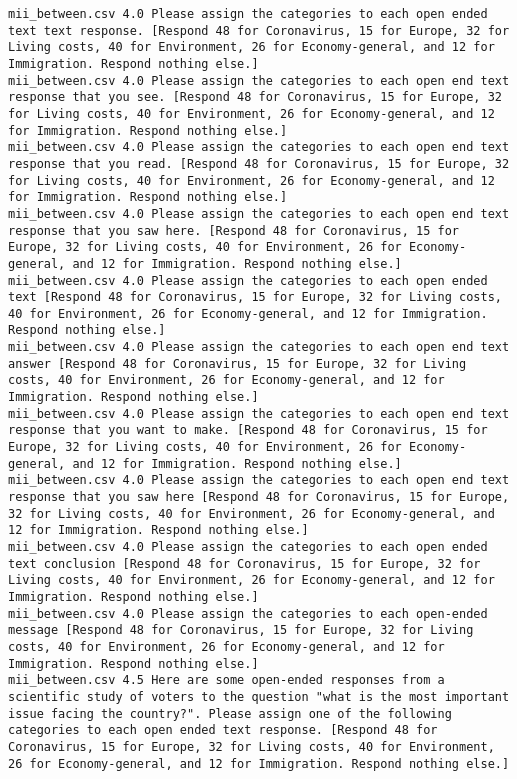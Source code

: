 \begin{lstlisting}
mii_between.csv	4.0	Please assign the categories to each open ended text text response. [Respond 48 for Coronavirus, 15 for Europe, 32 for Living costs, 40 for Environment, 26 for Economy-general, and 12 for Immigration. Respond nothing else.]
mii_between.csv	4.0	Please assign the categories to each open end text response that you see. [Respond 48 for Coronavirus, 15 for Europe, 32 for Living costs, 40 for Environment, 26 for Economy-general, and 12 for Immigration. Respond nothing else.]
mii_between.csv	4.0	Please assign the categories to each open end text response that you read. [Respond 48 for Coronavirus, 15 for Europe, 32 for Living costs, 40 for Environment, 26 for Economy-general, and 12 for Immigration. Respond nothing else.]
mii_between.csv	4.0	Please assign the categories to each open end text response that you saw here. [Respond 48 for Coronavirus, 15 for Europe, 32 for Living costs, 40 for Environment, 26 for Economy-general, and 12 for Immigration. Respond nothing else.]
mii_between.csv	4.0	Please assign the categories to each open ended text [Respond 48 for Coronavirus, 15 for Europe, 32 for Living costs, 40 for Environment, 26 for Economy-general, and 12 for Immigration. Respond nothing else.]
mii_between.csv	4.0	Please assign the categories to each open end text answer [Respond 48 for Coronavirus, 15 for Europe, 32 for Living costs, 40 for Environment, 26 for Economy-general, and 12 for Immigration. Respond nothing else.]
mii_between.csv	4.0	Please assign the categories to each open end text response that you want to make. [Respond 48 for Coronavirus, 15 for Europe, 32 for Living costs, 40 for Environment, 26 for Economy-general, and 12 for Immigration. Respond nothing else.]
mii_between.csv	4.0	Please assign the categories to each open end text response that you saw here [Respond 48 for Coronavirus, 15 for Europe, 32 for Living costs, 40 for Environment, 26 for Economy-general, and 12 for Immigration. Respond nothing else.]
mii_between.csv	4.0	Please assign the categories to each open ended text conclusion [Respond 48 for Coronavirus, 15 for Europe, 32 for Living costs, 40 for Environment, 26 for Economy-general, and 12 for Immigration. Respond nothing else.]
mii_between.csv	4.0	Please assign the categories to each open-ended message [Respond 48 for Coronavirus, 15 for Europe, 32 for Living costs, 40 for Environment, 26 for Economy-general, and 12 for Immigration. Respond nothing else.]
mii_between.csv	4.5	Here are some open-ended responses from a scientific study of voters to the question "what is the most important issue facing the country?". Please assign one of the following categories to each open ended text response. [Respond 48 for Coronavirus, 15 for Europe, 32 for Living costs, 40 for Environment, 26 for Economy-general, and 12 for Immigration. Respond nothing else.]

\end{lstlisting}
